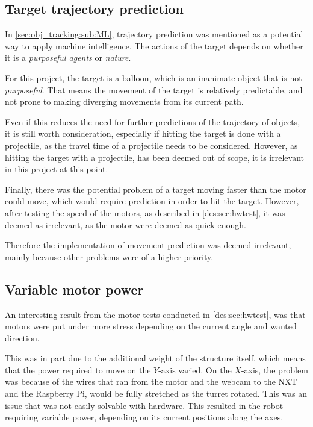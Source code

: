\subsection{Target trajectory prediction}
In \autoref{sec:obj_tracking:sub:ML}, trajectory prediction was mentioned as a potential way to apply machine intelligence.
The actions of the target depends on whether it is a \textit{purposeful agents} or \textit{nature}.

For this project, the target is a balloon, which is an inanimate object that is not \textit{purposeful}.
That means the movement of the target is relatively predictable, and not prone to making diverging movements from its current path.

Even if this reduces the need for further predictions of the trajectory of objects, it is still worth consideration, especially if hitting the target is done with a projectile, as the travel time of a projectile needs to be considered.
However, as hitting the target with a projectile, has been deemed out of scope, it is irrelevant in this project at this point.

Finally, there was the potential problem of a target moving faster than the motor could move, which would require prediction in order to hit the target.
However, after testing the speed of the motors, as described in \autoref{des:sec:hwtest}, it was deemed as irrelevant, as the motor were deemed as quick enough.

Therefore the implementation of movement prediction was deemed irrelevant, mainly because other problems were of a higher priority.

\subsection{Variable motor power}
\label{des:sec:variable_motor_power}
An interesting result from the motor tests conducted in \autoref{des:sec:hwtest}, was that motors were put under more stress depending on the current angle and wanted direction.

This was in part due to the additional weight of the structure itself, which means that the power required to move on the $Y$-axis varied.
On the $X$-axis, the problem was because of the wires that ran from the motor and the webcam to the NXT and the Raspberry Pi, would be fully stretched as the turret rotated.
This was an issue that was not easily solvable with hardware.
This resulted in the robot requiring variable power, depending on its current positions along the axes.

